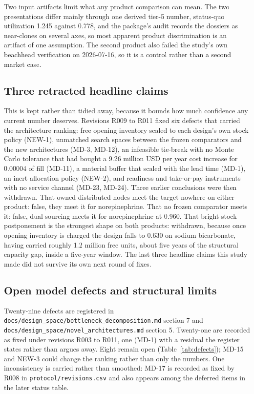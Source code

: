 Two input artifacts limit what any product comparison can mean. The two presentations differ mainly
through one derived tier-5 number, status-quo utilization 1.245 against 0.778, and the package's
audit records the dossiers as near-clones on several axes, so most apparent product discrimination
is an artifact of one assumption. The second product also failed the study's own beachhead
verification on 2026-07-16, so it is a control rather than a second market case.

\subsection{Three retracted headline claims}

This is kept rather than tidied away, because it bounds how much confidence any current number
deserves. Revisions R009 to R011 fixed six defects that carried the architecture ranking: free
opening inventory scaled to each design's own stock policy (NEW-1), unmatched search spaces between
the frozen comparators and the new architectures (MD-3, MD-12), an infeasible tie-break with no
Monte Carlo tolerance that had bought a 9.26 million USD per year cost increase for 0.00004 of fill
(MD-11), a material buffer that scaled with the lead time (MD-1), an inert allocation policy
(NEW-2), and readiness and take-or-pay instruments with no service channel (MD-23, MD-24). Three
earlier conclusions were then withdrawn. That owned distributed nodes meet the target nowhere on
either product: false, they meet it for norepinephrine. That no frozen comparator meets it: false,
dual sourcing meets it for norepinephrine at 0.960. That bright-stock postponement is the strongest
shape on both products: withdrawn, because once opening inventory is charged the design falls to
0.630 on sodium bicarbonate, having carried roughly 1.2 million free units, about five years of the
structural capacity gap, inside a five-year window. The last three headline claims this study made
did not survive its own next round of fixes.

\subsection{Open model defects and structural limits}

Twenty-nine defects are registered in
\texttt{docs/design\_space/bottleneck\_decomposition.md} section 7 and
\texttt{docs/design\_space/novel\_architectures.md} section 5. Twenty-one are recorded as fixed
under revisions R003 to R011, one (MD-1) with a residual the register states rather than argues
away. Eight remain open (Table~\ref{tab:defects}); MD-15 and NEW-3 could change the ranking rather
than only the numbers. One inconsistency is carried rather than smoothed: MD-17 is recorded as fixed
by R008 in \texttt{protocol/revisions.csv} and also appears among the deferred items in the later
status table.

